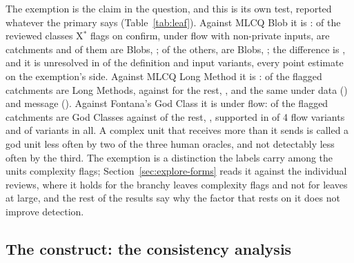 \documentclass[11pt,a4paper]{article}
\newcommand{\fitwidth}[1]{\resizebox{\ifdim\width>\textwidth\textwidth\else\width\fi}{!}{#1}}
\newcommand{\Xs}{X$^*$}
\newcommand{\dD}{$\Delta$D}
\newcommand{\dO}{$\Delta$O}
\newcommand{\dDO}{$\Delta$DO}
\begin{document}
The exemption is the claim in the question, and this is its own test,
reported whatever the primary says (Table~\ref{tab:leaf}). Against MLCQ Blob
it is \leafReading{}: of the \primXFlagged{} reviewed classes \Xs{} flags on
confirm, under flow with non-private inputs, \leafCatchFlagged{} are
catchments and \leafCatchPositive{} of them are Blobs, \leafCatchRate{}; of
the \leafRestFlagged{} others, \leafRestPositive{} are Blobs,
\leafRestRate{}; the difference is \leafDiff{}, and it is unresolved in
\leafClassUnresolved{} of the \leafClassVariants{} definition and input
variants, every point estimate on the exemption's side. Against MLCQ Long
Method it is \leafMethodReading{}: \leafMethodCatchPositive{} of the
\leafMethodCatchFlagged{} flagged catchments are Long Methods,
\leafMethodCatchRate{} against \leafMethodRestRate{} for the rest,
\leafMethodDiff{}, and the same under data (\leafMethodDataDiff{}) and
message (\leafMethodMessageDiff{}). Against Fontana's God Class it is
\leafFontanaReading{} under flow: \leafFontanaCatchRate{} of the flagged
catchments are God Classes against \leafFontanaRestRate{} of the rest,
\leafFontanaDiff{}, supported in \leafFontanaFlowSupported{} of 4 flow variants and
\leafFontanaSupported{} of \leafFontanaVariants{} variants in all.
A complex unit that receives more than it sends is called a god unit less
often by two of the three human oracles, and not detectably less often by
the third. The exemption is a distinction the labels carry among the units complexity
flags; Section~\ref{sec:explore-forms} reads it against the individual
reviews, where it holds for the branchy leaves complexity flags and not for
leaves at large, and the rest of the results say why the factor that rests
on it does not improve detection.

\subsection{The construct: the consistency analysis}
\label{sec:cons}

\begin{table}[t]
\centering
\caption{The consistency cells of the human oracles under the flow
definition, class form A with non-private inputs, every signal of the family
averaged: \dD{} is the paired MCC difference of X$\cdot$D against X, \dO{}
of X$\cdot$O against X, and \dDO{} of X$\cdot$D against X$\cdot$O. One
bootstrap over repositories gives every interval. $n$ is the number of
repositories (systems) carrying the oracle.}
\label{tab:cells-human}
\small
\setlength{\tabcolsep}{4pt}
\fitwidth{}
\end{table}
\end{document}
